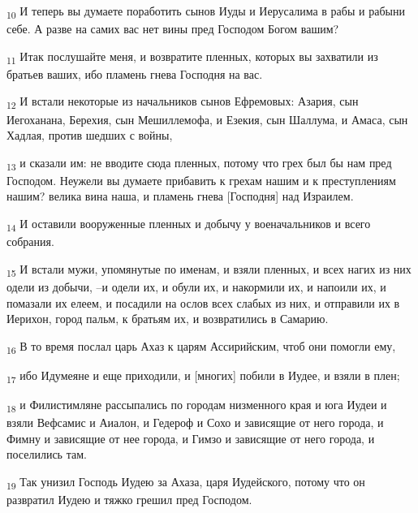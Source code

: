\begin{tcolorbox}
\textsubscript{10} И теперь вы думаете поработить сынов Иуды и Иерусалима в рабы и рабыни себе. А разве на самих вас нет вины пред Господом Богом вашим?
\end{tcolorbox}
\begin{tcolorbox}
\textsubscript{11} Итак послушайте меня, и возвратите пленных, которых вы захватили из братьев ваших, ибо пламень гнева Господня на вас.
\end{tcolorbox}
\begin{tcolorbox}
\textsubscript{12} И встали некоторые из начальников сынов Ефремовых: Азария, сын Иегоханана, Берехия, сын Мешиллемофа, и Езекия, сын Шаллума, и Амаса, сын Хадлая, против шедших с войны,
\end{tcolorbox}
\begin{tcolorbox}
\textsubscript{13} и сказали им: не вводите сюда пленных, потому что грех был бы нам пред Господом. Неужели вы думаете прибавить к грехам нашим и к преступлениям нашим? велика вина наша, и пламень гнева [Господня] над Израилем.
\end{tcolorbox}
\begin{tcolorbox}
\textsubscript{14} И оставили вооруженные пленных и добычу у военачальников и всего собрания.
\end{tcolorbox}
\begin{tcolorbox}
\textsubscript{15} И встали мужи, упомянутые по именам, и взяли пленных, и всех нагих из них одели из добычи, --и одели их, и обули их, и накормили их, и напоили их, и помазали их елеем, и посадили на ослов всех слабых из них, и отправили их в Иерихон, город пальм, к братьям их, и возвратились в Самарию.
\end{tcolorbox}
\begin{tcolorbox}
\textsubscript{16} В то время послал царь Ахаз к царям Ассирийским, чтоб они помогли ему,
\end{tcolorbox}
\begin{tcolorbox}
\textsubscript{17} ибо Идумеяне и еще приходили, и [многих] побили в Иудее, и взяли в плен;
\end{tcolorbox}
\begin{tcolorbox}
\textsubscript{18} и Филистимляне рассыпались по городам низменного края и юга Иудеи и взяли Вефсамис и Аиалон, и Гедероф и Сохо и зависящие от него города, и Фимну и зависящие от нее города, и Гимзо и зависящие от него города, и поселились там.
\end{tcolorbox}
\begin{tcolorbox}
\textsubscript{19} Так унизил Господь Иудею за Ахаза, царя Иудейского, потому что он развратил Иудею и тяжко грешил пред Господом.
\end{tcolorbox}
